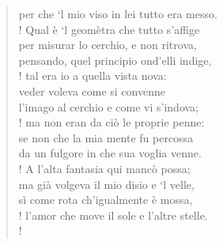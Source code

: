 \documentclass[a4paper, twoside, titlepage]{book}
\begin{document}
\begin{verse}
per che ‘l mio viso in lei tutto era messo.\\!
Qual è ‘l geomètra che tutto s’affige\\
per misurar lo cerchio, e non ritrova,\\
pensando, quel principio ond’elli indige,\\!
tal era io a quella vista nova:\\
veder voleva come si convenne\\
l’imago al cerchio e come vi s’indova;\\!
ma non eran da ciò le proprie penne:\\
se non che la mia mente fu percossa\\
da un fulgore in che sua voglia venne.\\!
A l’alta fantasia qui mancò possa;\\
ma già volgeva il mio disio e ‘l velle,\\
sì come rota ch’igualmente è mossa,\\!
l’amor che move il sole e l’altre stelle.\\!
\end{verse}
\end{document}
